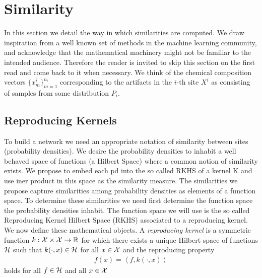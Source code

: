 \section{Similarity}
\label{sec:similarity}
In this section we detail the way in which similarities are computed. We draw inspiration from a well known set of methods in the machine learning community, and acknowledge that the mathematical machinery might not be familiar to the intended audience. Therefore the reader is invited to skip this section on the first read and come back to it when necessary.
We think of the chemical composition vectors $\{x^i_m\}_{m=1}^{n_i}$ corresponding to the artifacts in the $i$-th site $X^i$ as consisting of samples from some distribution $P_i$.
\subsection{Reproducing Kernels}
\label{kernels}
To build a network we need an appropriate notation of similarity between sites (probability densities). We desire the probability densities to inhabit a well behaved space of functions (a Hilbert Space) where a common notion of similarity exists. We propose to embed each pd into the so called RKHS of a kernel K and use iner product in this space as the similarity measure.
The similarities we propose capture similarities among probability densities as elements of a function space. To determine these similarities we need first determine the function space the probability densities inhabit. The function space we will use is the so called Reproducing Kernel Hilbert Space (RKHS) associated to a reproducing kernel. We now define these mathematical objects.
A {\it reproducing kernel} is a symmetric function $k: \mathcal{X}\times \mathcal{X}\rightarrow \mathbb{R}$ for which there exists a unique Hilbert space of functions $\mathcal{H}$ such that $k(\cdot,x)\in \mathcal{H}$ for all $x\in \mathcal{X}$ and the reproducing property
\begin{align}
f(x) = \left<f,k(\cdot,x)\right>
\end{align}
holds for all $f\in\mathcal{H}$ and all $x\in \mathcal{X}$

